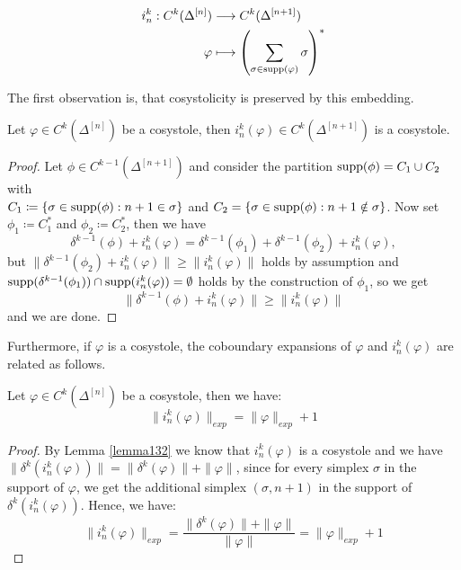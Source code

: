 \begin{align*}
i_n^k:C^k(\Delta^{[n]})&\longrightarrow C^k(\Delta^{[n+1]})\notag\\
\varphi&\longmapsto\left(\sum\limits_{\sigma\in\mathrm{supp}(\varphi)}\sigma\right)^*
\end{align*}

The first observation is, that cosystolicity is preserved by this embedding.

\begin{lem}\label{lemma132}
Let \(\varphi\in C^k(\Delta^{[n]})\) be a cosystole, then \(i_n^k(\varphi)\in C^k(\Delta^{[n+1]})\) is a cosystole.
\begin{proof}
Let \(\phi\in C^{k-1}(\Delta^{[n+1]})\) and consider the partition \(\mathrm{supp}(\phi)=C_1\cup C_2\) with\\
\(C_1\coloneqq \left\{\sigma\in\mathrm{supp}(\phi):n+1\in\sigma\right\}\) and \(C_2=\left\{\sigma\in\mathrm{supp}(\phi):n+1\notin\sigma\right\}\). Now set \(\phi_1\coloneqq C_1^*\) and \(\phi_2\coloneqq C_2^*\), then we have
\[
\delta^{k-1}(\phi)+i_n^k(\varphi)=\delta^{k-1}(\phi_1)+\delta^{k-1}(\phi_2)+i_n^k(\varphi),
\]
but \(\|\delta^{k-1}(\phi_2)+i_n^k(\varphi)\|\geq\|i_n^k(\varphi)\|\) holds by assumption and\\
\(\mathrm{supp}(\delta^{k-1}(\phi_1))\cap\mathrm{supp}(i_n^k(\varphi))=\emptyset\) holds by the construction of \(\phi_1\), so we get
\[
\|\delta^{k-1}(\phi)+i_n^k(\varphi)\|\geq\|i_n^k(\varphi)\|
\]
and we are done.
\end{proof}
\end{lem}

Furthermore, if \(\varphi\) is a cosystole, the coboundary expansions of \(\varphi\) and \(i_n^k(\varphi)\) are related as follows.

\begin{prop}\label{proposition113}
Let \(\varphi\in C^k(\Delta^{[n]})\) be a cosystole, then we have:
\[
\|i_n^k(\varphi)\|_{exp}=\|\varphi\|_{exp}+1
\]
\begin{proof}
By Lemma \ref{lemma132} we know that \(i_n^k(\varphi)\) is a cosystole and we have \(\|\delta^k(i_n^k(\varphi))\|=\|\delta^k(\varphi)\|+\|\varphi\|\), since for every simplex \(\sigma\) in the support of \(\varphi\), we get the additional simplex \((\sigma,n+1)\) in the support of \(\delta^k(i_n^k(\varphi))\). Hence, we have:
\[
\|i_n^k(\varphi)\|_{exp}=\frac{\|\delta^k(\varphi)\|+\|\varphi\|}{\|\varphi\|}=\|\varphi\|_{exp}+1
\]
\end{proof}
\end{prop}

